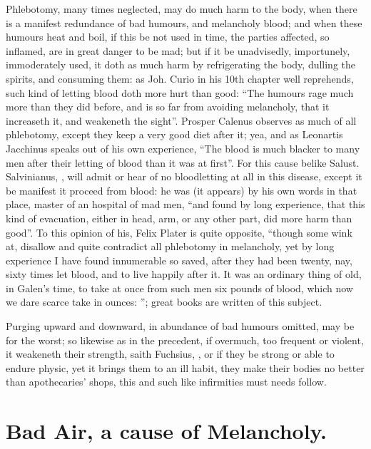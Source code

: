 Phlebotomy, many times neglected, may do much harm to
the body, when there is a manifest redundance of bad humours, and melancholy
blood; and when these humours heat and boil, if this be not used in time, the
parties affected, so inflamed, are in great danger to be mad; but if it be
unadvisedly, importunely, immoderately used, it doth as much harm by
refrigerating the body, dulling the spirits, and consuming them: as Joh.
Curio in his 10th chapter well reprehends, such kind of
letting blood doth more hurt than good: \enquote{The humours rage
much more than they did before, and is so far from avoiding melancholy, that it
increaseth it, and weakeneth the sight}. Prosper Calenus
observes as much of all phlebotomy, except they keep a very good diet after it;
yea, and as Leonartis Jacchinus speaks out of his own
experience, \enquote{The blood is much blacker to many men after
their letting of blood than it was at first}. For this cause belike Salust.
Salvinianus, , will admit or hear of no
bloodletting at all in this disease, except it be manifest it proceed from
blood: he was (it appears) by his own words in that place, master of an
hospital of mad men, \enquote{and found by long experience, that
this kind of evacuation, either in head, arm, or any other part, did more harm
than good}. To this opinion of his, Felix Plater is quite
opposite, \enquote{though some wink at, disallow and quite contradict all phlebotomy in
melancholy, yet by long experience I have found innumerable so saved, after
they had been twenty, nay, sixty times let blood, and to live happily after it.
It was an ordinary thing of old, in Galen's time, to take at once from such men
six pounds of blood, which now we dare scarce take in ounces: }; great books are written of this subject.

Purging upward and downward, in abundance of bad humours omitted, may be for
the worst; so likewise as in the precedent, if overmuch, too frequent or
violent, it weakeneth their strength, saith Fuchsius,
, or if they be strong or able to
endure physic, yet it brings them to an ill habit, they make their bodies no
better than apothecaries' shops, this and such like infirmities must needs
follow.

\section{Bad Air, a cause of Melancholy.}

